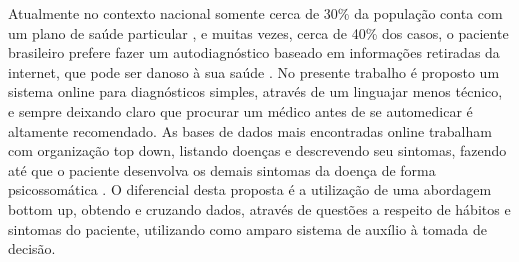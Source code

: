      
\begin{resumo} 
  Atualmente no contexto nacional somente cerca de 30\% da população conta com um plano de saúde particular \cite{brunobocchini2018}, e muitas vezes, cerca de 40\% dos casos, o paciente brasileiro prefere fazer um autodiagnóstico baseado em informações retiradas da internet, que pode ser danoso à sua saúde \cite{vanessathees2018}.
  No presente trabalho é proposto um sistema online para diagnósticos simples, através de um linguajar menos técnico, e sempre deixando claro que procurar um médico antes de se automedicar é altamente recomendado.
  As bases de dados mais encontradas online trabalham com organização top down, listando doenças e descrevendo seu sintomas, fazendo até que o paciente desenvolva os demais sintomas da doença de forma psicossomática \cite{julianacontaifer&isabellacavalcante2018}.
  O diferencial desta proposta é a utilização de uma abordagem bottom up, obtendo e cruzando dados, através de questões a respeito de hábitos e sintomas do paciente, utilizando como amparo sistema de auxílio à tomada de decisão.
\end{resumo}